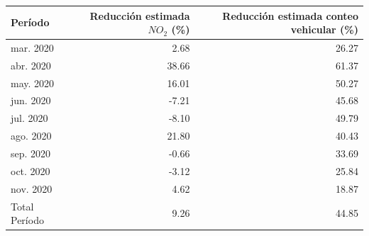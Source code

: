 \begin{table}[ht]
\centering
\begin{tabular}{lrr}
  \hline
Período & Reducción estimada ${NO_2}$ (\%) & Reducción estimada conteo vehicular (\%) \\ 
  \hline
mar. 2020 & 2.68 & 26.27 \\ 
  abr. 2020 & 38.66 & 61.37 \\ 
  may. 2020 & 16.01 & 50.27 \\ 
  jun. 2020 & -7.21 & 45.68 \\ 
  jul. 2020 & -8.10 & 49.79 \\ 
  ago. 2020 & 21.80 & 40.43 \\ 
  sep. 2020 & -0.66 & 33.69 \\ 
  oct. 2020 & -3.12 & 25.84 \\ 
  nov. 2020 & 4.62 & 18.87 \\ 
  Total Período & 9.26 & 44.85 \\ 
   \hline
\end{tabular}
\end{table}
